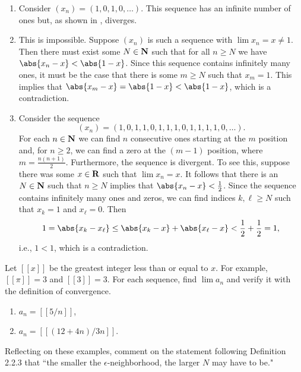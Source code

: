 \documentclass{lew98_solutions}
\begin{document}
\begin{solution}
    \begin{enumerate}
        \item Consider \( (x_n) = (1, 0, 1, 0, \ldots) \). This sequence has an infinite number of ones but, as shown in , diverges.

        \item This is impossible. Suppose \( (x_n) \) is such a sequence with \( \lim x_n = x \neq 1 \). Then there must exist some \( N \in \mathbf{N} \) such that for all \( n \geq N \) we have \( \abs{x_n - x} < \abs{1 - x} \). Since this sequence contains infinitely many ones, it must be the case that there is some \( m \geq N \) such that \( x_m = 1 \). This implies that \( \abs{x_m - x} = \abs{1 - x} < \abs{1 - x} \), which is a contradiction.

        \item Consider the sequence
        \[
            (x_n) = (1, 0, 1, 1, 0, 1, 1, 1, 0, 1, 1, 1, 1, 0, \ldots).
        \]
        For each \( n \in \mathbf{N} \) we can find \( n \) consecutive ones starting at the \( m \) position and, for \( n \geq 2 \), we can find a zero at the \( (m - 1) \) position, where \( m = \tfrac{n(n + 1)}{2} \). Furthermore, the sequence is divergent. To see this, suppose there was some \( x \in \mathbf{R} \) such that \( \lim x_n = x \). It follows that there is an \( N \in \mathbf{N} \) such that \( n \geq N \) implies that \( \abs{x_n - x} < \tfrac{1}{2} \). Since the sequence contains infinitely many ones and zeros, we can find indices \( k, \ell \geq N \) such that \( x_k = 1 \) and \( x_{\ell} = 0 \). Then
        \[
            1 = \abs{x_k - x_{\ell}} \leq \abs{x_k - x} + \abs{x_{\ell} - x} < \frac{1}{2} + \frac{1}{2} = 1,
        \]
        i.e., \( 1 < 1 \), which is a contradiction.
    \end{enumerate}
\end{solution}

\begin{exercise}
\label{ex:2.2.5}
    Let \( [[x]] \) be the greatest integer less than or equal to \( x \). For example, \( [[\pi]] = 3 \) and \( [[3]] = 3 \). For each sequence, find \( \lim a_n \) and verify it with the definition of convergence.
    \begin{enumerate}
        \item \( a_n = [[5/n]] \),

        \item \( a_n = [[(12 + 4n)/3n]] \).
    \end{enumerate}
    Reflecting on these examples, comment on the statement following Definition 2.2.3 that ``the smaller the \(\epsilon\)-neighborhood, the larger \( N \) may have to be."
\end{exercise}
\end{document}
